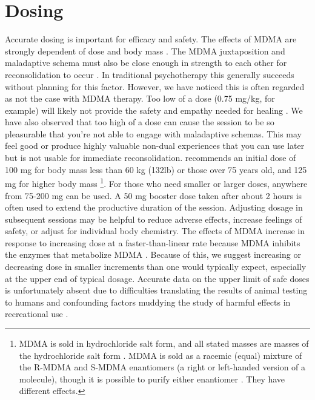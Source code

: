 \documentclass[12pt,letterpaper]{book}
\begin{document}
\section{Dosing}
\label{sec:dosing}
Accurate dosing is important for efficacy and safety. The effects of MDMA are strongly dependent of dose and body mass \cite{studerusResponse}. The MDMA juxtaposition and maladaptive schema must also be close enough in strength to each other for reconsolidation to occur \cite{eckerUnlocking}. In traditional psychotherapy this generally succeeds without planning for this factor. However, we have noticed this is often regarded as not the case with MDMA therapy. Too low of a dose (0.75 mg/kg, for example) will likely not provide the safety and empathy needed for healing \cite{bediMDMALowDose}. We have also observed that too high of a dose can cause the session to be so pleasurable that you're not able to engage with maladaptive schemas. This may feel good or produce highly valuable non-dual experiences that you can use later but is not usable for immediate reconsolidation. \textcite{liechtiInteractions} recommends an initial dose of 100 mg for body mass less than 60 kg (132lb) or those over 75 years old, and 125 mg for higher body mass \footnote{MDMA is sold in hydrochloride salt form, and all stated masses are masses of the hydrochloride salt form \cite{liechtiInteractions}. MDMA is sold as a racemic (equal) mixture of the R-MDMA and S-MDMA enantiomers (a right or left-handed version of a molecule), though it is possible to purify either enantiomer \cite{straumann2024racemic}. They have different effects.}. For those who need smaller or larger doses, anywhere from 75-200 mg can be used. A 50 mg booster dose taken after about 2 hours is often used to extend the productive duration of the session. Adjusting dosage in subsequent sessions may be helpful to reduce adverse effects, increase feelings of safety, or adjust for individual body chemistry. The effects of MDMA increase in response to increasing dose at a faster-than-linear rate because MDMA inhibits the enzymes that metabolize MDMA \cite{de2000nonlinear}. Because of this, we suggest increasing or decreasing dose in smaller increments than one would typically expect, especially at the upper end of typical dosage. Accurate data on the upper limit of safe doses is unfortunately absent due to difficulties translating the results of animal testing to humans and confounding factors muddying the study of harmful effects in recreational use \cite{passieHistory}.
\end{document}
